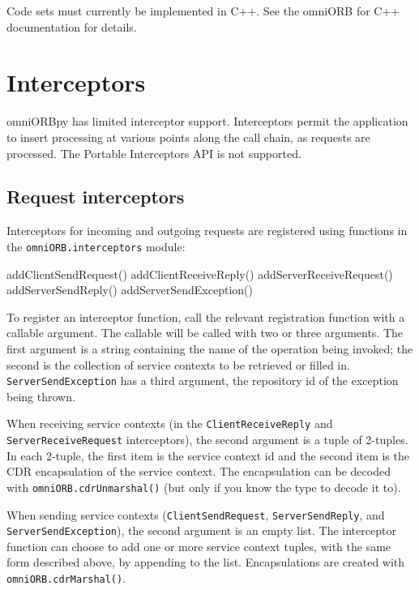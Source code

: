 \documentclass[11pt,oneside,a4paper]{book}
\newcommand{\code}[1]{\texttt{#1}}
\newcommand{\op}[1]{\texttt{#1()}}
\newcommand{\dsc}{\discretionary{}{}{}}
\begin{document}
Code sets must currently be implemented in C++. See the omniORB for
C++ documentation for details.



\chapter{Interceptors}
\label{chap:interceptors}

omniORBpy has limited interceptor support. Interceptors permit the
application to insert processing at various points along the call
chain, as requests are processed. The Portable Interceptors API is not
supported.

\section{Request interceptors}

Interceptors for incoming and outgoing requests are registered using
functions in the \code{omniORB.interceptors} module:

\begin{pylisting}
  addClientSendRequest()
  addClientReceiveReply()
  addServerReceiveRequest()
  addServerSendReply()
  addServerSendException()
\end{pylisting}

To register an interceptor function, call the relevant registration
function with a callable argument. The callable will be called with
two or three arguments. The first argument is a string containing the
name of the operation being invoked; the second is the collection of
service contexts to be retrieved or filled in.
\code{ServerSendException} has a third argument, the repository id of
the exception being thrown.

When receiving service contexts (in the \code{ClientReceiveReply} and
\code{Server\dsc{}ReceiveRequest} interceptors), the second argument
is a tuple of 2-tuples. In each 2-tuple, the first item is the service
context id and the second item is the CDR encapsulation of the service
context. The encapsulation can be decoded with
\op{omniORB.cdrUnmarshal} (but only if you know the type to decode it
to).

When sending service contexts (\code{ClientSendRequest},
\code{ServerSendReply}, and \code{ServerSendException}), the second
argument is an empty list. The interceptor function can choose to add
one or more service context tuples, with the same form described
above, by appending to the list.  Encapsulations are created with
\op{omniORB.cdrMarshal}.
\end{document}
